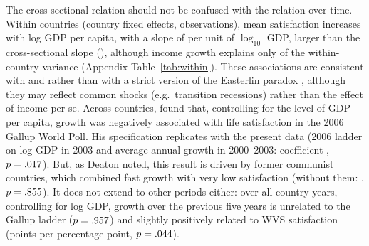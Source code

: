 \documentclass[12pt]{article}
\begin{document}
The cross-sectional relation should not be confused with the relation over time. Within countries (country fixed effects, \nWithin observations), mean satisfaction increases with log GDP per capita, with a slope of \withinSlopeSatisfiedMean per unit of $\log_{10}$ GDP, larger than the cross-sectional slope (\crossSlopeSatisfiedMean), although income growth explains only \withinRtwoSatisfiedMean of the within-country variance (Appendix Table~\ref{tab:within}). These associations are consistent with \citet{stevenson_economic_2008} and \citet{sacks_new_2012} rather than with a strict version of the Easterlin paradox \citep{easterlin_does_1974,easterlin_happiness_2010}, although they may reflect common shocks (e.g.\ transition recessions) rather than the effect of income per se. Across countries, \citet{deaton_income_2008} found that, controlling for the level of GDP per capita, growth was negatively associated with life satisfaction in the 2006 Gallup World Poll. His specification replicates with the present data (2006 ladder on log GDP in 2003 and average annual growth in 2000--2003: coefficient \deatonGrowth, $p = .017$). But, as Deaton noted, this result is driven by former communist countries, which combined fast growth with very low satisfaction (without them: \deatonGrowthNoExCommunist, $p = .855$). It does not extend to other periods either: over all country-years, controlling for log GDP, growth over the previous five years is unrelated to the Gallup ladder ($p = .957$) and slightly positively related to WVS satisfaction (\growthCoefWVS points per percentage point, $p = .044$).
\end{document}
